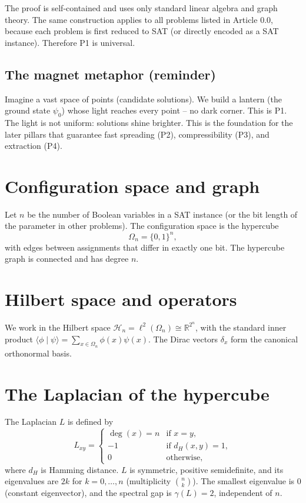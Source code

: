 \documentclass[11pt,a4paper]{article}
\begin{document}
The proof is self‑contained and uses only standard linear algebra and graph theory. The same construction applies to all problems listed in Article 0.0, because each problem is first reduced to SAT (or directly encoded as a SAT instance). Therefore P1 is universal.

\subsection*{The magnet metaphor (reminder)}

Imagine a vast space of points (candidate solutions). We build a lantern (the ground state \(\psi_0\)) whose light reaches every point – no dark corner. This is P1. The light is not uniform: solutions shine brighter. This is the foundation for the later pillars that guarantee fast spreading (P2), compressibility (P3), and extraction (P4).

\section{Configuration space and graph}

Let \(n\) be the number of Boolean variables in a SAT instance (or the bit length of the parameter in other problems). The configuration space is the hypercube
\[
\Omega_n = \{0,1\}^n,
\]
with edges between assignments that differ in exactly one bit. The hypercube graph is connected and has degree \(n\).

\section{Hilbert space and operators}

We work in the Hilbert space \(\mathcal{H}_n = \ell^2(\Omega_n) \cong \mathbb{R}^{2^n}\), with the standard inner product \(\langle \phi \mid \psi \rangle = \sum_{x\in\Omega_n} \phi(x)\psi(x)\). The Dirac vectors \(\delta_x\) form the canonical orthonormal basis.

\section{The Laplacian of the hypercube}

The Laplacian \(L\) is defined by
\[
L_{xy} = \begin{cases}
\deg(x)=n & \text{if } x=y,\\
-1 & \text{if } d_H(x,y)=1,\\
0 & \text{otherwise},
\end{cases}
\]
where \(d_H\) is Hamming distance. \(L\) is symmetric, positive semidefinite, and its eigenvalues are \(2k\) for \(k=0,\dots,n\) (multiplicity \(\binom{n}{k}\)). The smallest eigenvalue is \(0\) (constant eigenvector), and the spectral gap is \(\gamma(L)=2\), independent of \(n\).
\end{document}
